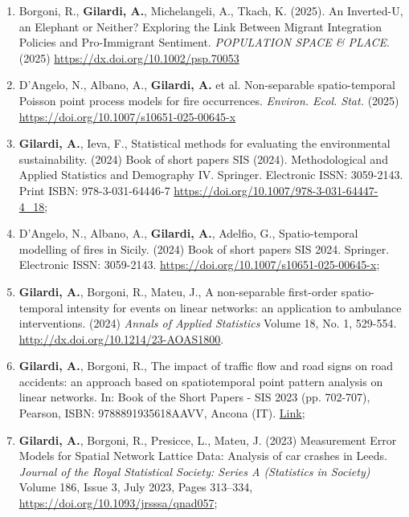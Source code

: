 \documentclass[11pt,a4paper,sans]{moderncv}
\begin{document}
  \begin{enumerate}
  \item Borgoni, R., \textbf{Gilardi, A.}, Michelangeli, A., Tkach, K. (2025). An Inverted-U, an Elephant or Neither? Exploring the Link Between Migrant Integration Policies and Pro-Immigrant Sentiment. \emph{POPULATION SPACE \& PLACE}. (2025) \url{https://dx.doi.org/10.1002/psp.70053}
  \item D’Angelo, N., Albano, A., \textbf{Gilardi, A.} et al. Non-separable spatio-temporal Poisson point process models for fire occurrences. \emph{Environ. Ecol. Stat.} (2025) \url{https://doi.org/10.1007/s10651-025-00645-x}
  \item \textbf{Gilardi, A.}, Ieva, F., Statistical methods for evaluating the environmental sustainability. (2024) Book of short papers SIS (2024). Methodological and Applied Statistics and Demography IV. Springer. Electronic ISSN: 3059-2143. Print ISBN: 978-3-031-64446-7 \url{https://doi.org/10.1007/978-3-031-64447-4_18}; 
  \item D'Angelo, N., Albano, A., \textbf{Gilardi, A.}, Adelfio, G., Spatio-temporal modelling of fires in Sicily. (2024) Book of short papers SIS 2024. Springer. Electronic ISSN: 3059-2143. \url{https://doi.org/10.1007/s10651-025-00645-x}; 
  \item \textbf{Gilardi, A.}, Borgoni, R., Mateu, J., A non-separable first-order spatio-temporal intensity for events on linear networks: an application to ambulance interventions. (2024) \textit{Annals of Applied Statistics} Volume 18, No. 1, 529-554. \url{http://dx.doi.org/10.1214/23-AOAS1800}.
  \item \textbf{Gilardi, A.}, Borgoni, R., The impact of traffic flow and road signs on road accidents: an approach based on spatiotemporal point pattern analysis on linear networks. In: Book of the Short Papers - SIS 2023 (pp. 702-707), Pearson, ISBN: 9788891935618AAVV, Ancona (IT). \href{https://it.pearson.com/content/dam/region-core/italy/pearson-italy/pdf/Docenti/Universit%C3%A0/bozza-book-compresso.pdf}{Link};  
  \item \textbf{Gilardi, A.}, Borgoni, R., Presicce, L., Mateu, J. (2023) Measurement Error Models for Spatial Network Lattice Data: Analysis of car crashes in Leeds. \textit{Journal of the Royal Statistical Society: Series A (Statistics in Society)} Volume 186, Issue 3, July 2023, Pages 313–334, \url{https://doi.org/10.1093/jrsssa/qnad057};

\end{enumerate}
\end{document}
